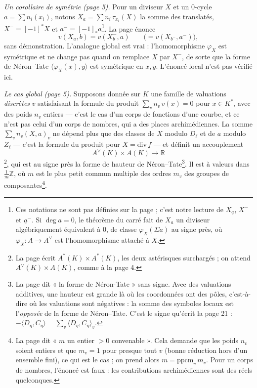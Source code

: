 \documentclass[11pt,a4paper]{article}
\begin{document}
\emph{Un corollaire de symétrie (page 5).} Pour un diviseur $X$ et un
$0$-cycle $a = \sum n_i(x_i)$, notons $X_a = \sum n_i\, \tau_{x_i}(X)$
la somme des translatés, $X^- = [-1]^* X$ et $a^- = [-1]_* a$\footnote{Ces
notations ne sont pas définies sur la page ; c'est notre lecture de
$X_{\underline a}$, $X^{-}$ et $\underline a^{-}$. Si $\deg a = 0$, le
théorème du carré fait de $X_a$ un diviseur algébriquement équivalent à
$0$, de classe $\varphi_X(\Sigma a)$ au signe près, où
$\varphi_X : A \to A^\vee$ est l'homomorphisme attaché à $X$.}. La page
énonce
\[
  v(X_a, b) = v(X^-_b, a) \qquad \bigl(= v(X_{b^-}, a^-)\bigr),
\]
sans démonstration. L'analogue global est vrai : l'homomorphisme
$\varphi_X$ est symétrique et ne change pas quand on remplace $X$ par
$X^-$, de sorte que la forme de Néron–Tate
$\langle \varphi_X(x), y\rangle$ est symétrique en $x, y$. L'énoncé local
n'est pas vérifié ici.

\emph{Le cas global (page 5).} Supposons donnée sur $K$ une famille de
valuations \emph{discrètes} $v$ satisfaisant la formule du produit
$\sum_v n_v\, v(x) = 0$ pour $x \in K^*$, avec des poids $n_v$ entiers
— c'est le cas d'un corps de fonctions d'une courbe, et ce n'est pas celui
d'un corps de nombres, qui a des places archimédiennes. La somme
$\sum_v n_v (X, a)_v$ ne dépend plus que des classes de $X$ modulo
$D_\ell$ et de $a$ modulo $Z_\ell$ — c'est la formule du produit pour
$X = \mathrm{div}\,f$ — et définit un accouplement
\[
  A^\vee(K) \times A(K) \longrightarrow \mathbb{R}
\]
\footnote{La page écrit $A^{*}(K) \times A^{*}(K)$, les deux astérisques
surchargés ; on attend $A^\vee(K) \times A(K)$, comme à la page 4.}, qui est
au signe près la forme de hauteur de Néron–Tate\footnote{La page dit
« la forme de Néron-Tate » sans signe. Avec des valuations additives, une
hauteur est grande là où les coordonnées ont des pôles, c'est-à-dire où
les valuations sont négatives : la somme des symboles locaux est
l'\emph{opposée} de la forme de Néron–Tate. C'est le signe qu'écrit la page
21 : $-\langle D_\eta, C_\eta\rangle = \sum_v \langle D_\eta,
C_\eta\rangle_v$.}. Il est à valeurs dans $\frac{1}{m}\mathbb{Z}$, où $m$
est le plus petit commun multiple des ordres $m_v$ des groupes de
composantes\footnote{La page dit « $m$ un entier $> 0$ convenable ». Cela
demande que les poids $n_v$ soient entiers et que $m_v = 1$ pour presque
tout $v$ (bonne réduction hors d'un ensemble fini), ce qui est le cas ; on
prend alors $m = \mathrm{ppcm}_v\, m_v$. Pour un corps de nombres,
l'énoncé est faux : les contributions archimédiennes sont des réels
quelconques.}.
\end{document}
